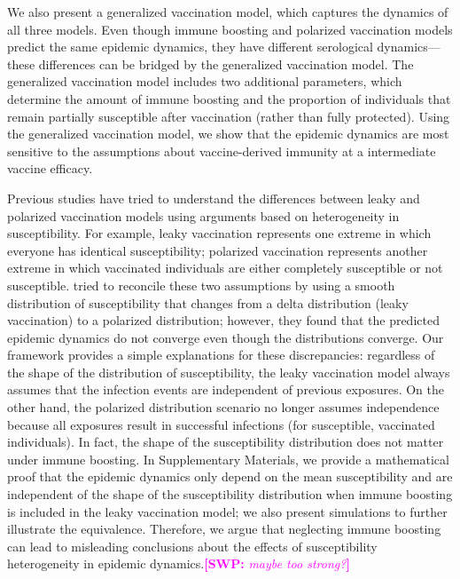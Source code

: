 \documentclass[12pt]{article}
\newcommand{\comment}{\showcomment}
\newcommand{\showcomment}[3]{\textcolor{#1}{\textbf{[#2: }\textsl{#3}\textbf{]}}}
\newcommand{\swp}[1]{\comment{magenta}{SWP}{#1}}
\begin{document}
We also present a generalized vaccination model, which captures the dynamics of all three models.
Even though immune boosting and polarized vaccination models predict the same epidemic dynamics, they have different serological dynamics---these differences can be bridged by the generalized vaccination model.
The generalized vaccination model includes two additional parameters, which determine the amount of immune boosting and the proportion of individuals that remain partially susceptible after vaccination (rather than fully protected).
Using the generalized vaccination model, we show that the epidemic dynamics are most sensitive to the assumptions about vaccine-derived immunity at a intermediate vaccine efficacy.

Previous studies have tried to understand the differences between leaky and polarized vaccination models using arguments based on heterogeneity in susceptibility.
For example, leaky vaccination represents one extreme in which everyone has identical susceptibility;
polarized vaccination represents another extreme in which vaccinated individuals are either completely susceptible or not susceptible.
\cite{gomes2014missing} tried to reconcile these two assumptions by using a smooth distribution of susceptibility that changes from a delta distribution (leaky vaccination) to a polarized distribution;
however, they found that the predicted epidemic dynamics do not converge even though the distributions converge.
Our framework provides a simple explanations for these discrepancies:
regardless of the shape of the distribution of susceptibility, the leaky vaccination model always assumes that the infection events are independent of previous exposures.
On the other hand, the polarized distribution scenario no longer assumes independence because all exposures result in successful infections (for susceptible, vaccinated individuals).
In fact, the shape of the susceptibility distribution does not matter under immune boosting.
In Supplementary Materials, we provide a mathematical proof that the epidemic dynamics only depend on the mean susceptibility and are independent of the shape of the susceptibility distribution when immune boosting is included in the leaky vaccination model; we also present simulations to further illustrate the equivalence.
Therefore, we argue that neglecting immune boosting can lead to misleading conclusions about the effects of susceptibility heterogeneity in epidemic dynamics.\swp{maybe too strong?}
\end{document}
